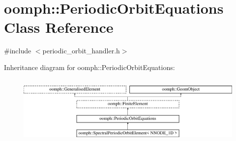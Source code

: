 \hypertarget{classoomph_1_1PeriodicOrbitEquations}{}\section{oomph\+:\+:Periodic\+Orbit\+Equations Class Reference}
\label{classoomph_1_1PeriodicOrbitEquations}


{\ttfamily \#include $<$periodic\+\_\+orbit\+\_\+handler.\+h$>$}

Inheritance diagram for oomph\+:\+:Periodic\+Orbit\+Equations\+:\begin{figure}[H]
\begin{center}
\leavevmode
\includegraphics[height=3.489097cm]{classoomph_1_1PeriodicOrbitEquations}
\end{center}
\end{figure}
